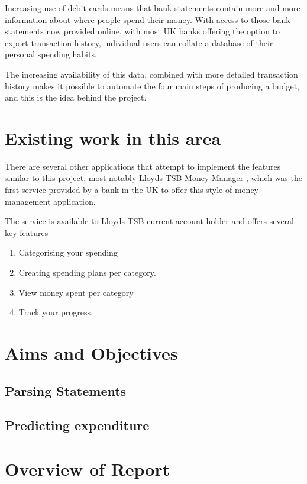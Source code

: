 Increasing use of debit cards\cite{bbc2010debit} means that bank statements contain more and more information about where people spend their money. With access to those bank statements now provided online, with most UK banks offering the option to export \gls{transaction} history, individual users can collate a database of their personal spending habits.

The increasing availability of this data, combined with more detailed transaction history makes it possible to automate the four main steps of producing a budget, and this is the idea behind the project.

\section{Existing work in this area}

There are several other applications that attempt to implement the features similar to this project, most notably Lloyds TSB Money Manager \cite{lloyds2014money}, which was the first service provided by a bank in the UK to offer this style of money management application.

The service is available to Lloyds TSB current account holder and offers several key features

\begin{enumerate}
\item Categorising your spending
\item Creating spending plans per category.
\item View money spent per category
\item Track your progress.
\end{enumerate}



\section{Aims and Objectives}

\subsection{Parsing Statements}

\subsection{Predicting expenditure}

\section{Overview of Report}
